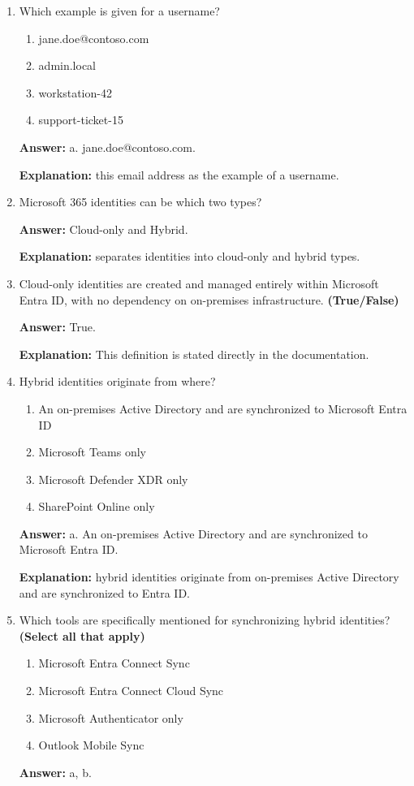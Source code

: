 \documentclass[10pt]{article}
\begin{document}
\begin{enumerate}[leftmargin=*]
\textbf{Explanation:} All four are listed in the documentation as parts of a typical identity.

\item Which example is given for a username?
\begin{enumerate}[label=\alph*., leftmargin=1.5em]
\item jane.doe@contoso.com
\item admin.local
\item workstation-42
\item support-ticket-15
\end{enumerate}
\textbf{Answer:} a. jane.doe@contoso.com.

\textbf{Explanation:} this email address as the example of a username.

\item Microsoft 365 identities can be which two types?

\textbf{Answer:} Cloud-only and Hybrid.

\textbf{Explanation:} separates identities into cloud-only and hybrid types.

\item Cloud-only identities are created and managed entirely within Microsoft Entra ID, with no dependency on on-premises infrastructure. \textbf{(True/False)}

\textbf{Answer:} True.

\textbf{Explanation:} This definition is stated directly in the documentation.

\item Hybrid identities originate from where?
\begin{enumerate}[label=\alph*., leftmargin=1.5em]
\item An on-premises Active Directory and are synchronized to Microsoft Entra ID
\item Microsoft Teams only
\item Microsoft Defender XDR only
\item SharePoint Online only
\end{enumerate}
\textbf{Answer:} a. An on-premises Active Directory and are synchronized to Microsoft Entra ID.

\textbf{Explanation:} hybrid identities originate from on-premises Active Directory and are synchronized to Entra ID.

\item Which tools are specifically mentioned for synchronizing hybrid identities? \textbf{(Select all that apply)}
\begin{enumerate}[label=\alph*., leftmargin=1.5em]
\item Microsoft Entra Connect Sync
\item Microsoft Entra Connect Cloud Sync
\item Microsoft Authenticator only
\item Outlook Mobile Sync
\end{enumerate}
\textbf{Answer:} a, b.


\end{enumerate}
\end{document}
